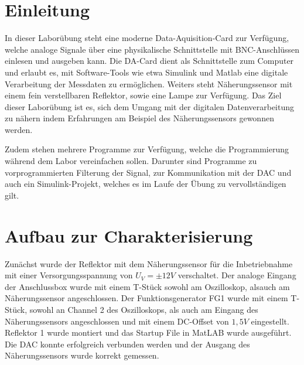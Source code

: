 \documentclass[a4paper]{article}
\begin{document}
\newpage
\section{Einleitung}
In dieser Laborübung steht eine moderne Data-Aquisition-Card zur Verfügung,
welche analoge Signale über eine physikalische Schnittstelle mit BNC-Anschlüssen
einlesen und ausgeben kann. Die DA-Card dient als Schnittstelle zum Computer und
erlaubt es, mit Software-Tools wie etwa Simulink und Matlab eine digitale
Verarbeitung der Messdaten zu ermöglichen.\newline
Weiters steht Näherungssensor mit einem fein verstellbaren  Reflektor, sowie eine
Lampe zur Verfügung. Das Ziel dieser Laborübung ist es, sich dem Umgang mit der
digitalen Datenverarbeitung zu nähern indem Erfahrungen am Beispiel des
Näherungssensors gewonnen werden.

Zudem stehen mehrere Programme zur Verfügung, welche die Programmierung während
dem Labor vereinfachen sollen. Darunter sind Programme zu vorprogrammierten
Filterung der Signal, zur Kommunikation mit der DAC und auch ein Simulink-Projekt,
welches es im Laufe der Übung zu vervollständigen gilt.

\section{Aufbau zur Charakterisierung}
Zunächst wurde der Reflektor mit dem Näherungssensor für die Inbetriebnahme mit
einer Versorgungsspannung von $U_{V}=\pm12\unit{V}$ verschaltet. Der analoge
Eingang der Anschlussbox wurde mit einem T-Stück sowohl am Oszilloskop, alsauch
am Näherungssensor angeschlossen. Der Funktionsgenerator FG1 wurde mit einem T-Stück,
sowohl an Channel 2 des Oszilloskops, als auch am Eingang des Näherungssensors
angeschlossen und mit einem DC-Offset von $1,5 \unit{V}$ eingestellt.
Reflektor 1 wurde montiert und das Startup File in MatLAB wurde ausgeführt. Die
DAC konnte erfolgreich verbunden werden und der Ausgang des Näherungssensors wurde
korrekt gemessen.
\end{document}
